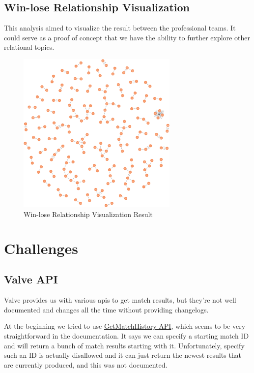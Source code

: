 \documentclass{article}
\begin{document}
\subsection{Win-lose Relationship Visualization}

This analysis aimed to visualize the result between the professional teams.
It could serve as a proof of concept that we have the ability to further explore other relational topics.

\begin{figure}[H]
\centering
\includegraphics[width=0.7\textwidth]{pic/win-lose-viz.png}
\caption{Win-lose Relationship Visualization Result}
\label{win-lose-relationship-visualization-result}
\end{figure}


\section{Challenges}

\subsection{Valve API}

Valve provides us with various apis to get match results, but they're not well documented and changes all the time without providing changelogs.

At the beginning we tried to use \href{https://wiki.teamfortress.com/wiki/WebAPI/GetMatchHistory}{GetMatchHistory API}, which seems to be very straightforward in the documentation.
It says we can specify a starting match ID and will return a bunch of match results starting with it.
Unfortunately, specify such an ID is actually disallowed and it can just return the newest results that are currently produced, and this was not documented.
\end{document}
